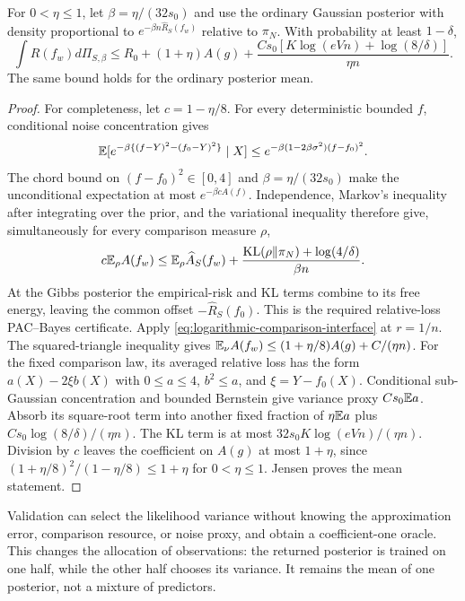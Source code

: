 \begin{lemma}
\label{lem:log-comparison-fixed-temperature}
For $0<\eta\le1$, let $\beta=\eta/(32s_0)$ and use the ordinary Gaussian posterior with density proportional to $e^{-\beta n\widehat R_S(f_w)}$ relative to $\pi_N$. With probability at least $1-\delta$,
\[
 \int R(f_w)d\Pi_{S,\beta}
 \le R_0+(1+\eta)A(g)
      +\frac{C s_0[K\log(eVn)+\log(8/\delta)]}{\eta n}.
\]
The same bound holds for the ordinary posterior mean.
\end{lemma}
\begin{proof}
For completeness, let $c=1-\eta/8$. For every deterministic bounded $f$, conditional noise concentration gives
\[
 \mathbb E[e^{-\beta\{(f-Y)^2-(f_0-Y)^2\}}\mid X]
 \le e^{-\beta(1-2\beta\sigma^2)(f-f_0)^2}.
\]
The chord bound on $(f-f_0)^2\in[0,4]$ and $\beta=\eta/(32s_0)$ make the unconditional expectation at most $e^{-\beta c A(f)}$. Independence, Markov's inequality after integrating over the prior, and the variational inequality therefore give, simultaneously for every comparison measure $\rho$,
\[
 c\mathbb E_\rho A(f_w)\le\mathbb E_\rho\widehat A_S(f_w)
       +\frac{\operatorname{KL}(\rho\|\pi_N)+\log(4/\delta)}{\beta n}.
\]
At the Gibbs posterior the empirical-risk and KL terms combine to its free energy, leaving the common offset $-\widehat R_S(f_0)$. This is the required relative-loss PAC--Bayes certificate. Apply \eqref{eq:logarithmic-comparison-interface} at $r=1/n$. The squared-triangle inequality gives
$\mathbb E_\nu A(f_w)\le(1+\eta/8)A(g)+C/(\eta n)$.
For the fixed comparison law, its averaged relative loss has the form
$a(X)-2\xi b(X)$ with $0\le a\le4$, $b^2\le a$, and $\xi=Y-f_0(X)$. Conditional sub-Gaussian concentration and bounded Bernstein give variance proxy $Cs_0\mathbb E a$. Absorb its square-root term into another fixed fraction of $\eta\mathbb E a$ plus $Cs_0\log(8/\delta)/(\eta n)$. The KL term is at most $32s_0K\log(eVn)/(\eta n)$. Division by $c$ leaves the coefficient on $A(g)$ at most $1+\eta$, since $(1+\eta/8)^2/(1-\eta/8)\le1+\eta$ for $0<\eta\le1$. Jensen proves the mean statement.
\end{proof}

Validation can select the likelihood variance without knowing the approximation error, comparison resource, or noise proxy, and obtain a coefficient-one oracle. This changes the allocation of observations: the returned posterior is trained on one half, while the other half chooses its variance. It remains the mean of one posterior, not a mixture of predictors.

